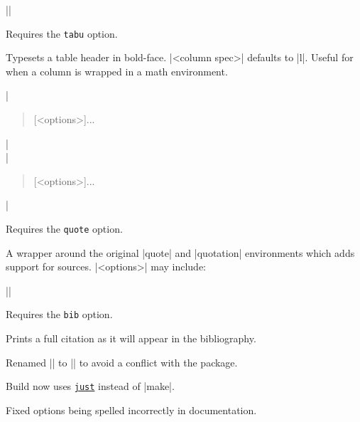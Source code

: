 \documentclass{ltxguidex}
\newcommand{\reqopt}[1]{Requires the \texttt{\color{magenta}#1} option.\par}
\begin{document}
\begin{desc}
||
\end{desc}

\reqopt{tabu} Typesets a table header in bold-face. |<column spec>| defaults
to |l|. Useful for when a column is wrapped in a math environment.

\begin{desc}
|\begin{quote}[<options>]...\end{quote}|\\
|\begin{quotation}[<options>]...\end{quotation}|\\
\end{desc}

\reqopt{quote} A wrapper around the original |quote| and |quotation|
environments which adds support for sources. |<options>| may include:

\begin{desc}
||
\end{desc}

\reqopt{bib} Prints a full citation as it will appear in the bibliography.

\begin{changelog}[author=Rebecca Turner]
\begin{version}[v=0.2.0, date=2019-10-15]
\changed
  \item Renamed |\intro| to |\essayintro| to avoid a conflict with the
     package.
  \item Build now uses \href{https://github.com/casey/just}{\texttt{just}} instead of
  |make|.
\fixed
  \item Fixed options being spelled incorrectly in documentation.
\end{version}
\end{changelog}
\end{document}
